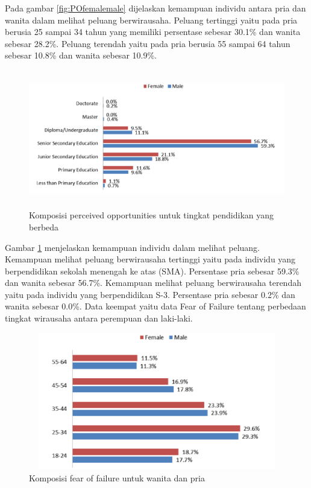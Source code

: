 \documentclass[a4paper,twoside]{article}
\begin{document}
\begin{enumerate}
Pada gambar \ref{fig:POfemalemale} dijelaskan kemampuan individu antara pria dan wanita dalam melihat peluang berwirausaha. Peluang tertinggi yaitu pada pria berusia 25 sampai 34 tahun yang memiliki persentase sebesar 30.1\% dan wanita sebesar 28.2\%. Peluang terendah yaitu pada pria berusia 55 sampai 64 tahun sebesar 10.8\% dan wanita sebesar 10.9\%. 

\begin{figure} [H]
	\centering  
	\includegraphics[width=14cm, height=6cm]{POpendidikan} 
	\caption[Komposisi perceived opportunities untuk tingkat pendidikan yang berbeda]{Komposisi perceived opportunities untuk tingkat pendidikan yang berbeda} 
	\label{fig:POpendidikan} 
\end{figure}  

Gambar \ref{fig:POpendidikan} menjelaskan kemampuan individu dalam melihat peluang. Kemampuan melihat peluang berwirausaha tertinggi yaitu pada individu yang berpendidikan sekolah menengah ke atas (SMA). Persentase pria sebesar 59.3\% dan wanita sebesar 56.7\%. Kemampuan melihat peluang berwirausaha terendah yaitu pada individu yang berpendidikan S-3. Persentase pria sebesar 0.2\% dan wanita sebesar 0.0\%. Data keempat yaitu data Fear of Failure tentang perbedaan tingkat wirausaha antara perempuan dan laki-laki.

\begin{figure} [H]
	\centering  
	\includegraphics[width=13cm, height=6cm]{FOFfemalemale} 
	\caption[Komposisi fear of failure untuk wanita dan pria]{Komposisi fear of failure untuk wanita dan pria} 
	\label{fig:FOF} 
\end{figure}  


\end{enumerate}
\end{document}
